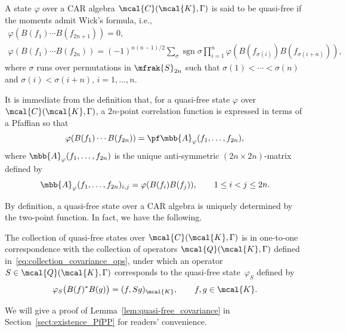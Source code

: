 \begin{Definition}A state $\varphi$ over a CAR algebra $\mcal{C}(\mcal{K},\Gamma)$ is said to be quasi-free if the moments admit Wick's formula, i.e.,
\begin{gather*}%
	\varphi (B(f_{1})\cdots B(f_{2n+1}) ) =0, \\
	\varphi (B(f_{1})\cdots B(f_{2n}) ) =(-1)^{n(n-1)/2}\sum_{\sigma}\operatorname{sgn} \sigma \prod_{i=1}^{n}\varphi (B(f_{\sigma (i)})B(f_{\sigma (i+n)}) ),
\end{gather*}
where $\sigma$ runs over permutations in $\mfrak{S}_{2n}$ such that $\sigma(1)<\cdots<\sigma (n)$ and $\sigma (i)<\sigma (i+n)$, $i=1,\dots, n$.
\end{Definition}

It is immediate from the definition that, for a quasi-free state $\varphi$ over $\mcal{C}(\mcal{K},\Gamma)$, a $2n$-point correlation function is expressed in terms of a Pfaffian so that
\begin{equation*}
	\varphi (B(f_{1})\cdots B(f_{2n}) )=\pf \mbb{A}_{\varphi}(f_{1},\dots, f_{2n}),
\end{equation*}
where $\mbb{A}_{\varphi}(f_{1},\dots, f_{2n})$ is the unique anti-symmetric $(2n\times 2n)$-matrix defined by
\begin{equation*}
	\mbb{A}_{\varphi}(f_{1},\dots, f_{2n})_{i,j}=\varphi (B(f_{i})B(f_{j}) ),\qquad 1\le i <j \le 2n.
\end{equation*}

By definition, a quasi-free state over a CAR algebra is uniquely determined by the two-point function. In fact, we have the following.
\begin{Lemma}\label{lem:quasi-free_covariance}
The collection of quasi-free states over $\mcal{C}(\mcal{K},\Gamma)$ is in one-to-one correspondence with the collection of operators $\mcal{Q}(\mcal{K},\Gamma)$ defined in~\eqref{eq:collection_covariance_ops}, under which an operator $S\in\mcal{Q}(\mcal{K},\Gamma)$ corresponds to the quasi-free state~$\varphi_{S}$ defined by
\begin{equation*}%
	\varphi_{S}\big(B(f)^{\ast}B(g)\big)=(f,Sg)_{\mcal{K}},\qquad f,g\in\mcal{K}.
\end{equation*}
\end{Lemma}
We will give a proof of Lemma~\ref{lem:quasi-free_covariance} in Section~\ref{sect:existence_PfPP} for readers' convenience.

